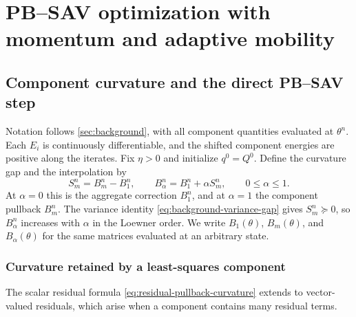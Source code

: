 \section{PB--SAV optimization with momentum and adaptive mobility}
\label{sec:methodology}

\subsection{Component curvature and the direct PB--SAV step}
\label{sec:common-notation}

Notation follows \cref{sec:background}, with all component quantities
evaluated at \(\theta^n\). Each \(E_i\) is continuously differentiable, and
the shifted component energies are positive along the iterates. Fix
\(\eta>0\) and initialize \(q^0=Q^0\). Define the curvature gap and the
interpolation by
\begin{equation}
  S_m^n=B_m^n-B_1^n,
  \qquad
  B_\alpha^n=B_1^n+\alpha S_m^n,
  \qquad 0\leq\alpha\leq1.
  \label{eq:mixed-pullback}
\end{equation}
At \(\alpha=0\) this is the aggregate correction \(B_1^n\), and at
\(\alpha=1\) the component pullback \(B_m^n\). The variance identity
\cref{eq:background-variance-gap} gives \(S_m^n\succeq0\), so
\(B_\alpha^n\) increases with \(\alpha\) in the Loewner order. We write
\(B_1(\theta)\), \(B_m(\theta)\), and \(B_\alpha(\theta)\) for the same
matrices evaluated at an arbitrary state.

\subsubsection{Curvature retained by a least-squares component}

The scalar residual formula \cref{eq:residual-pullback-curvature} extends to
vector-valued residuals, which arise when a component contains many residual
terms.

